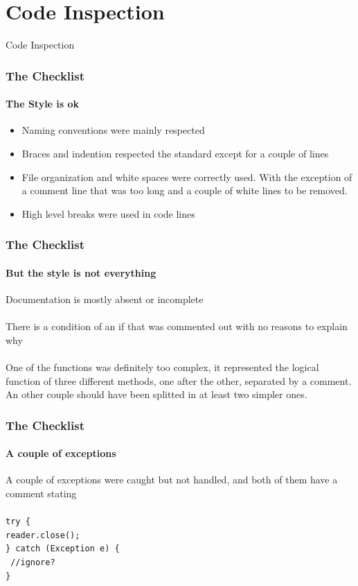 \documentclass[10pt,xcolor={usenames,dvipsnames}]{beamer}
\begin{document}
\section[Section]{Code Inspection}
\begin{frame}
	\begin{center}
		Code Inspection
	\end{center}
\end{frame}
\begin{frame}
	\frametitle{The Checklist}
	\framesubtitle{The Style is ok}
	\begin{itemize}
		\item Naming conventions were mainly respected
		\item Braces and indention respected the standard except for a couple of lines
		\item File organization and white spaces were correctly used. With the exception of a comment line that was too long and a couple of white lines to be removed.
		\item High level breaks were used in code lines
	\end{itemize}
\end{frame}
\begin{frame}
	\frametitle{The Checklist}
	\framesubtitle{But the style is not everything}
	Documentation is mostly absent or incomplete\\
	\-\\
	There is a condition of an if that was commented out with no reasons to explain why\\
	\-\\
	One of the functions was definitely too complex, it represented the logical function of three different methods, one after the other, separated by a comment.\\
	An other couple should have been splitted in at least two simpler ones.
\end{frame}
\begin{frame}
	\frametitle{The Checklist}
	\framesubtitle{A couple of exceptions}
	A couple of exceptions were caught but not handled, and both of them have a comment stating\\
	\-\\
	\texttt{{\color{Blue}try }\{\\\-	reader.close();\\\} {\color{Blue}catch} (Exception e) \{\\{\color{Green}\-	//ignore?}\\\}}
\end{frame}
\end{document}
